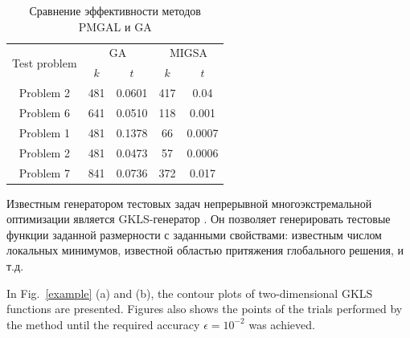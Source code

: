 \documentclass[
11pt,%
tightenlines,%
twoside,%
onecolumn,%
nofloats,%
nobibnotes,%
nofootinbib,%
superscriptaddress,%
noshowpacs,%
centertags]%
{revtex4}
\begin{document}
\begin{table}
	\caption{Сравнение эффективности методов PMGAL и GA}
	\label{tab:1}
	\center
	\begin{tabular}{|c|c|c|c|c|}
		\hline
	\multirow{2}{*}{Test problem}	 & \multicolumn{2}{c|}{ GA } &  \multicolumn{2}{c|}{MIGSA} \\
		\cline{2-3} \cline{4-5} 
		 & $k$ & $t$ &  $k$ & $t$  \\
		\hline 
		 Problem 2 \cite{Floudas}&	481 &	0.0601 & 	417 &	0.04 \\
		 Problem 6 \cite{Floudas}&	641 &	0.0510 & 	118 &	0.001 \\
		 Problem 1 \cite{Deep}   &	481 &	0.1378 & 	66 &	0.0007 \\
		 Problem 2 \cite{Deep}   &	481 &	0.0473 & 	57 &	0.0006 \\
		 Problem 7 \cite{Deep}   &	841 &	0.0736 &  372	 &	0.017 \\
		\hline
	\end{tabular}
\end{table}	




Известным генератором тестовых задач непрерывной многоэкстремальной оптимизации является GKLS-генератор \cite{Gaviano}. Он позволяет генерировать тестовые функции заданной размерности с заданными свойствами: известным числом локальных минимумов, известной областью притяжения глобального решения, и т.д.  

In Fig.~\ref{example} (a) and (b), the contour plots of two-dimensional GKLS functions are presented. Figures also shows the points of the trials performed by the method until the required accuracy $\epsilon=10^{-2}$ was achieved.
\end{document}
